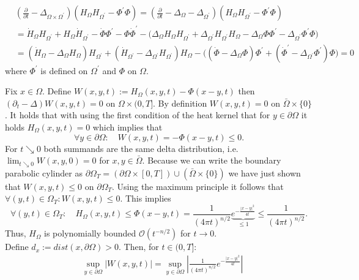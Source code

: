\documentclass[A4,12pt,twoside]{book}
\begin{document}
{\begin{itemize}
\begin{align*}
            &(\frac{\partial }{\partial t} - \Delta_{\Omega \times \Omega^\prime} ) ( H_\Omega H_{\Omega^\prime} - \Phi^\prime \Phi )= (\frac{\partial }{\partial t} - \Delta_{\Omega} -  \Delta_{\Omega^\prime} ) ( H_\Omega H_{\Omega^\prime} - \Phi^\prime \Phi )\\
            &=\dot{H}_{\Omega} H_{\Omega^\prime} + H_{\Omega} \dot{H}_{\Omega^\prime} - \dot{\Phi} \Phi^\prime - \Phi \dot{\Phi}^\prime - \big( \Delta_\Omega H_\Omega H_{\Omega^\prime} + \Delta_{\Omega^\prime} H_{\Omega^\prime} H_\Omega - \Delta_\Omega \Phi \Phi^\prime - \Delta_{\Omega^\prime } \Phi^\prime \Phi   \big) \\
            &= (\dot{H}_\Omega - \Delta_\Omega H_\Omega) H_{\Omega^\prime} + (\dot{H}_{\Omega^\prime} - \Delta_{\Omega^\prime} H_{\Omega^\prime} ) H_\Omega - \big( (\dot{\Phi} - \Delta_\Omega \Phi ) \Phi^\prime + (\dot{ \Phi}^\prime - \Delta_{\Omega^\prime} \Phi^\prime) \Phi \big)=0
        \end{align*}
        where $\Phi^\prime $ is defined on $\Omega^\prime$ and $\Phi$ on $\Omega$.
    \end{itemize}
    Fix $x \in \Omega$. Define $W(x,y,t) :=  H_\Omega (x,y,t)- \Phi (x-y,t)$ then $(\partial_t - \Delta) W(x,y,t)=0$ on $\Omega \times (0,T]$. By definition $W(x,y,t) =0$ on $\bar{\Omega} \times \{0\}$. It holds that with using the first condition of the heat kernel that for $y \in \partial \Omega$ it holds $H_\Omega (x,y,t)=0$ which implies that 
    \[
    \forall y \in \partial \Omega: \quad W(x,y,t)= -\Phi (x-y,t)\leq 0.
    \]
    For $t\searrow 0$ both summands are the same delta distribution, i.e. $\lim_{t \searrow 0} W(x,y,0)=0$ for $x,y \in \bar{\Omega}$. Because we can write the boundary parabolic cylinder as $\partial \Omega_T = (\partial \Omega \times [0,T]) \cup (\bar{\Omega} \times \{0\})$ we have just shown that $W(x,y,t) \leq 0$ on $\partial \Omega_T$. Using the maximum principle it follows that $\forall (y,t) \in \Omega_T: W(x,y,t) \leq 0$. This implies 
    \[
    \forall (y,t) \in \Omega_T:\quad  H_\Omega (x,y,t) \leq \Phi (x-y,t) = \frac{1}{(4 \pi t)^{n/2}} \underbrace{e^{- \frac{|x-y|^2}{4t}}}_{\leq 1} \leq \frac{1}{(4 \pi t)^{n/2}}.
    \] 
    Thus, $H_\Omega$ is polynomially bounded $\mathcal{O} (t^{-n/2})$ for $t \to 0$.\\
    Define $d_x := dist (x, \partial \Omega)>0$. Then, for $t \in (0,T]$:
    \begin{align*}
        &\sup_{y \in \partial \Omega} |W(x,y,t)| = \sup_{y \in \partial \Omega} \left| \frac{1}{(4 \pi t)^{n/2}} e^{- \frac{|x-y|^2}{4t}} \right| \\

\end{align*}}
\end{document}
